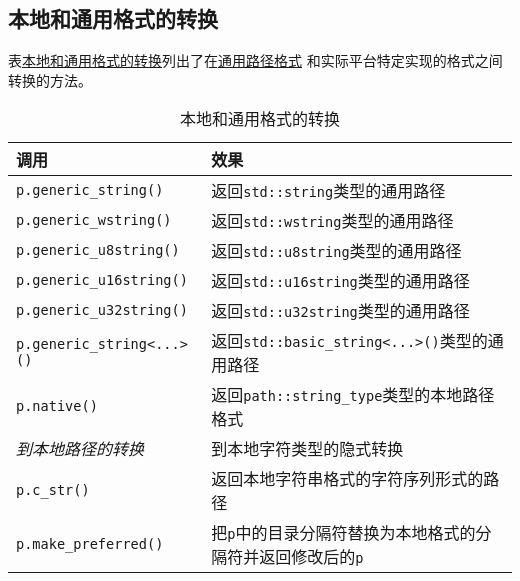 \subsection{本地和通用格式的转换}\label{ch20.3.4}
表\hyperref[t20.6]{本地和通用格式的转换}列出了在\hyperref[ch20.2.3]{通用路径格式}
和实际平台特定实现的格式之间转换的方法。
\begin{table}[htb]
    \centering
    \begin{tabular}{l|l}
        \hline
        \textbf{调用}                       & \textbf{效果}                                    \\
        \hline
        \texttt{p.generic\_string()}      & 返回\texttt{std::string}类型的通用路径                  \\
        \texttt{p.generic\_wstring()}     & 返回\texttt{std::wstring}类型的通用路径                 \\
        \texttt{p.generic\_u8string()}    & 返回\texttt{std::u8string}类型的通用路径                \\
        \texttt{p.generic\_u16string()}   & 返回\texttt{std::u16string}类型的通用路径               \\
        \texttt{p.generic\_u32string()}   & 返回\texttt{std::u32string}类型的通用路径               \\
        \texttt{p.generic\_string<...>()} & 返回\texttt{std::basic\_string<...>()}类型的通用路径    \\
        \texttt{p.native()}               & 返回\texttt{path::string\_type}类型的本地路径格式         \\
        \emph{到本地路径的转换}                   & 到本地字符类型的隐式转换                                   \\
        \texttt{p.c\_str()}               & 返回本地字符串格式的字符序列形式的路径                            \\
        \texttt{p.make\_preferred()}      & 把\texttt{p}中的目录分隔符替换为本地格式的分隔符并返回修改后的\texttt{p} \\
        \hline
    \end{tabular}
    \caption{本地和通用格式的转换}
    \label{t20.6}
\end{table}

